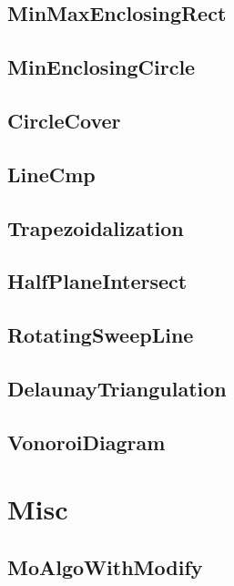 	\subsection{MinMaxEnclosingRect}
	
	\subsection{MinEnclosingCircle}
	
	\subsection{CircleCover}
	
	\subsection{LineCmp}
	
	\subsection{Trapezoidalization}
	
	\subsection{HalfPlaneIntersect}
	
	\subsection{RotatingSweepLine}
	
	\subsection{DelaunayTriangulation}
	
	\subsection{VonoroiDiagram}
	
\section{Misc}
	\subsection{MoAlgoWithModify}
	
